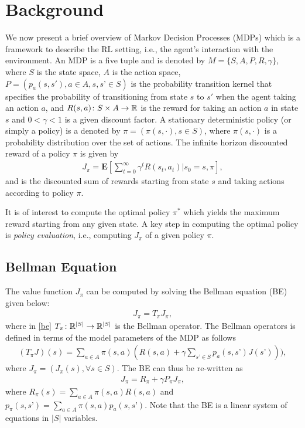 \section{Background}
We now present a brief overview of Markov Decision Processes (MDPs) which is a framework to describe the RL setting, i.e., the agent's interaction with the environment. An MDP is a five tuple and is denoted by $M=\{S,A,P,R,\gamma\}$, where $S$ is the state space, $A$ is the action space, $P=(p_a(s,s'),a\in A,s,s’\in S)$ is the probability transition kernel that specifies the probability of transitioning from state $s$ to $s'$ when the agent taking an action $a$, and $R(s,a)\colon S\times A\rightarrow \mathbb{R}$ is the reward for taking an action $a$ in state $s$ and $0<\gamma<1$ is a given discount factor. A stationary deterministic policy (or simply a policy) is a denoted by $\pi=(\pi(s,\cdot),s\in S)$, where $\pi(s,\cdot)$ is a probability distribution over the set of actions. The infinite horizon discounted reward of a policy $\pi$ is given by
\begin{align}
J_\pi=\mathbf{E}[\sum_{t=0}^\infty \gamma^t R(s_t,a_t)| s_0=s, \pi],
\end{align}
and is the discounted sum of rewards starting from state $s$ and taking actions according to policy $\pi$.\par
It is of interest to compute the optimal policy $\pi^*$ which yields the maximum reward starting from any given state. A key step in computing the optimal policy is \emph{policy evaluation}, i.e.,  computing $J_\pi$ of a given policy $\pi$.\par
\subsection{Bellman Equation}
The value function $J_\pi$ can be computed by solving the Bellman equation (BE) given below:
\begin{align}\label{be}
J_\pi=T_\pi J_\pi,
\end{align}
where in \eqref{be} $T_\pi\colon \mathbb{R}^{|S|}\rightarrow \mathbb{R}^{|S|}$ is the Bellman operator. The Bellman operators is defined in terms of the model parameters of the MDP as follows
\begin{align}\label{bo}
(T_\pi J)(s)=\sum_{a\in A}\pi(s,a)(R(s,a)+\gamma \sum_{s’\in S}p_a(s,s’) J(s’))),
\end{align}
where $J_\pi=(J_\pi(s),\forall s\in S)$. The BE can thus be re-written as 
\begin{align}\label{be}
J_\pi=R_\pi+\gamma P_\pi J_\pi,
\end{align}
where $R_\pi(s)=\sum_{a\in A}\pi(s,a) R(s,a)$ and $p_\pi(s,s’)=\sum_{a\in A}\pi(s,a)p_a(s,s’)$. Note that the BE is a linear system of equations in $|S|$ variables.\par
